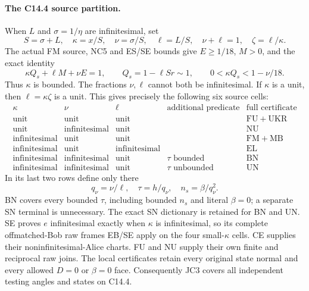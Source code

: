 \paragraph{The C14.4 source partition.}
When $L$ and $\sigma=1/\eta$ are infinitesimal, set
\[
 S=\sigma+L,\quad\kappa=x/S,\quad\nu=\sigma/S,
 \quad\ell=L/S,\quad\nu+\ell=1,\quad\zeta=\ell/\kappa.
                                                               \tag{JC1}
\]
The actual FM source, NC5 and ES/SE bounds give $E\ge1/18$,
$M>0$, and the exact identity
\[
 \kappa Q_s+\ell M+\nu E=1,\qquad
 Q_s=1-\ell Sr\sim1,\qquad
 0<\kappa Q_s<1-\nu/18.                                \tag{JC2}
\]
Thus $\kappa$ is bounded.  The fractions $\nu,\ell$ cannot both
be infinitesimal.  If $\kappa$ is a unit, then $\ell=\kappa\zeta$
is a unit.  This gives precisely the following six source cells:
\[
\begin{array}{c|c|c|c|l}
\kappa&\nu&\ell&\text{additional predicate}&\text{full certificate}\\\hline
\text{unit}&\text{unit}&\text{unit}& &\mathrm{FU+UKR}\\
\text{unit}&\text{infinitesimal}&\text{unit}& &\mathrm{NU}\\
\text{infinitesimal}&\text{unit}&\text{unit}& &\mathrm{FM+MB}\\
\text{infinitesimal}&\text{unit}&\text{infinitesimal}& &\mathrm{EL}\\
\text{infinitesimal}&\text{infinitesimal}&\text{unit}&\tau\text{ bounded}&\mathrm{BN}\\
\text{infinitesimal}&\text{infinitesimal}&\text{unit}&\tau\text{ unbounded}&\mathrm{UN}
\end{array}                                                     \tag{JC3}
\]
In its last two rows define only there
\[
                q_\nu=\nu/\ell,\quad\tau=h/q_\nu,
                       \quad n_s=\beta/q_\nu^2.          \tag{JC4}
\]
BN covers every bounded $\tau$, including bounded $n_s$ and
literal $\beta=0$; a separate SN terminal is unnecessary.
The exact SN dictionary is retained for BN and UN.  SE proves
$e$ infinitesimal exactly when $\kappa$ is infinitesimal, so
its complete offmatched-Bob raw frames EB/SE apply on the four
small-$\kappa$ cells.  CE supplies their noninfinitesimal-Alice
charts.  FU and NU supply their own finite and reciprocal raw
joins.  The local certificates retain every original state normal
and every allowed $D=0$ or $\beta=0$ face.  Consequently JC3
covers all independent testing angles and states on C14.4.

